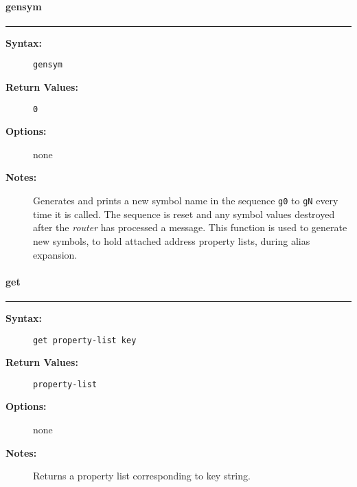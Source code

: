 \vspace {2pt}


\paragraph{gensym}

\hrule
\begin{description}
\item[{\bf Syntax:}] \mbox{}

{\tt gensym}

\item[{\bf Return Values:}] \mbox{}

\begin{description}
\item[{\tt 0}] \mbox{}



\end{description}


\item[{\bf Options:}] \mbox{}

none  

\item[{\bf Notes:}] \mbox{}

Generates and prints a new symbol name in the 
sequence {\tt g0} to {\tt gN} every time it is called. The 
sequence is reset and any symbol values destroyed after the {\em router\/} 
has processed a message. This function is used to generate new symbols, to 
hold attached address property lists, during alias expansion.

\end{description}


\vspace {2pt}


\paragraph{get}

\hrule
\begin{description}
\item[{\bf Syntax:}] \mbox{}

{\tt get property-list key}

\item[{\bf Return Values:}] \mbox{}

{\tt property-list}

\item[{\bf Options:}] \mbox{}

none  

\item[{\bf Notes:}] \mbox{}

Returns a property list corresponding to key string.

\end{description}


